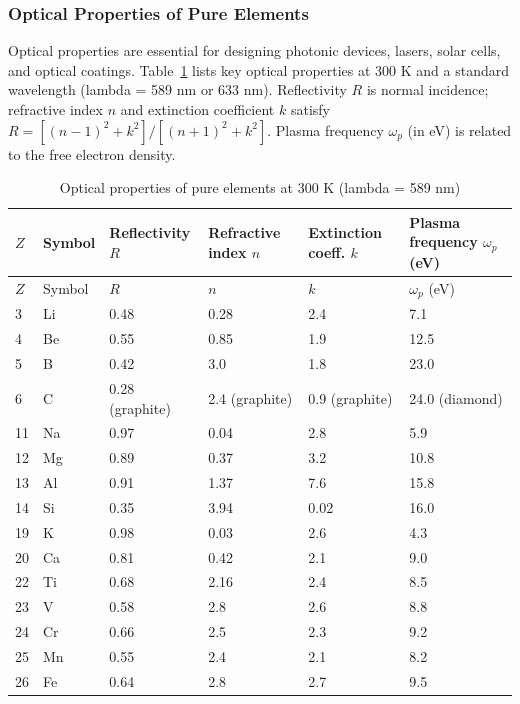 \documentclass[12pt,a4paper]{article}
\begin{document}
	\subsubsection{Optical Properties of Pure Elements}
	\label{subsec:optical-properties}
	
	Optical properties are essential for designing photonic devices, lasers, solar cells, and optical coatings. Table~\ref{tab:optical-properties-func} lists key optical properties at 300 K and a standard wavelength (lambda = 589 nm or 633 nm). Reflectivity \(R\) is normal incidence; refractive index \(n\) and extinction coefficient \(k\) satisfy \(R = [(n-1)^2 + k^2]/[(n+1)^2 + k^2]\). Plasma frequency \(\omega_p\) (in eV) is related to the free electron density.
	
	\begin{longtable}{p{0.8cm}p{1.2cm}p{2.2cm}p{2.2cm}p{2.2cm}p{2.2cm}}
		\caption{Optical properties of pure elements at 300 K (lambda = 589 nm)} \label{tab:optical-properties-func} \\
		\toprule
		\(Z\) & Symbol & Reflectivity \(R\) & Refractive index \(n\) & Extinction coeff. \(k\) & Plasma frequency \(\omega_p\) (eV) \\
		\midrule
		\endfirsthead
		\toprule
		\(Z\) & Symbol & \(R\) & \(n\) & \(k\) & \(\omega_p\) (eV) \\
		\midrule
		\endhead
		3  & Li & 0.48 & 0.28 & 2.4 & 7.1 \\
		4  & Be & 0.55 & 0.85 & 1.9 & 12.5 \\
		5  & B  & 0.42 & 3.0 & 1.8 & 23.0 \\
		6  & C  & 0.28 (graphite) & 2.4 (graphite) & 0.9 (graphite) & 24.0 (diamond) \\
		11 & Na & 0.97 & 0.04 & 2.8 & 5.9 \\
		12 & Mg & 0.89 & 0.37 & 3.2 & 10.8 \\
		13 & Al & 0.91 & 1.37 & 7.6 & 15.8 \\
		14 & Si & 0.35 & 3.94 & 0.02 & 16.0 \\
		19 & K  & 0.98 & 0.03 & 2.6 & 4.3 \\
		20 & Ca & 0.81 & 0.42 & 2.1 & 9.0 \\
		22 & Ti & 0.68 & 2.16 & 2.4 & 8.5 \\
		23 & V  & 0.58 & 2.8 & 2.6 & 8.8 \\
		24 & Cr & 0.66 & 2.5 & 2.3 & 9.2 \\
		25 & Mn & 0.55 & 2.4 & 2.1 & 8.2 \\
		26 & Fe & 0.64 & 2.8 & 2.7 & 9.5 \\

\end{longtable}
\end{document}

